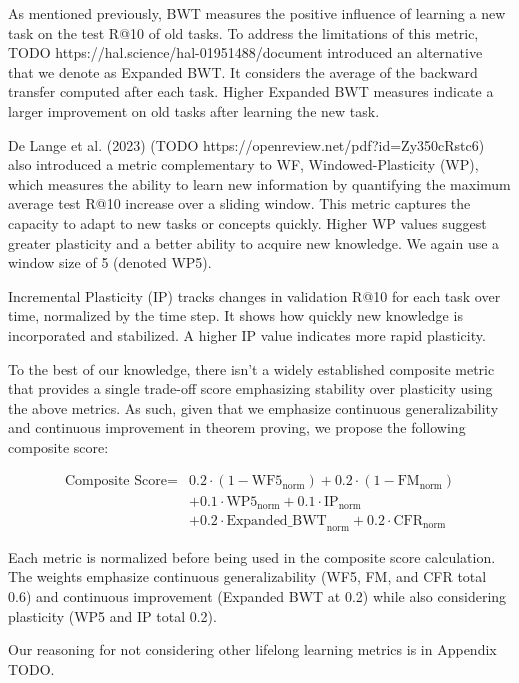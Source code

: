 \documentclass{article} %
\begin{document}
As mentioned previously, BWT measures the positive influence of learning a new task on the test R@10 of old tasks. To address the limitations of this metric, TODO https://hal.science/hal-01951488/document introduced an alternative that we denote as Expanded BWT. It considers the average of the backward transfer computed after each task. Higher Expanded BWT measures indicate a larger improvement on old tasks after learning the new task.

De Lange et al. (2023) (TODO https://openreview.net/pdf?id=Zy350cRstc6) also introduced a metric complementary to WF, Windowed-Plasticity (WP), which measures the ability to learn new information by quantifying the maximum average test R@10 increase over a sliding window. This metric captures the capacity to adapt to new tasks or concepts quickly. Higher WP values suggest greater plasticity and a better ability to acquire new knowledge. We again use a window size of 5 (denoted WP5).

Incremental Plasticity (IP) tracks changes in validation R@10 for each task over time, normalized by the time step. It shows how quickly new knowledge is incorporated and stabilized. A higher IP value indicates more rapid plasticity.

To the best of our knowledge, there isn't a widely established composite metric that provides a single trade-off score emphasizing stability over plasticity using the above metrics. As such, given that we emphasize continuous generalizability and continuous improvement in theorem proving, we propose the following composite score:

\begin{align*}
\text{Composite Score} = & 0.2 \cdot (1 - \text{WF5}_\text{norm}) + 0.2 \cdot (1 - \text{FM}_\text{norm}) \\
                         & + 0.1 \cdot \text{WP5}_\text{norm} + 0.1 \cdot \text{IP}_\text{norm} \\
                         & + 0.2 \cdot \text{Expanded\_BWT}_\text{norm} + 0.2 \cdot \text{CFR}_\text{norm}
\end{align*}

Each metric is normalized before being used in the composite score calculation. The weights emphasize continuous generalizability (WF5, FM, and CFR total 0.6) and continuous improvement (Expanded BWT at 0.2) while also considering plasticity (WP5 and IP total 0.2).

Our reasoning for not considering other lifelong learning metrics is in Appendix TODO. 
\end{document}

